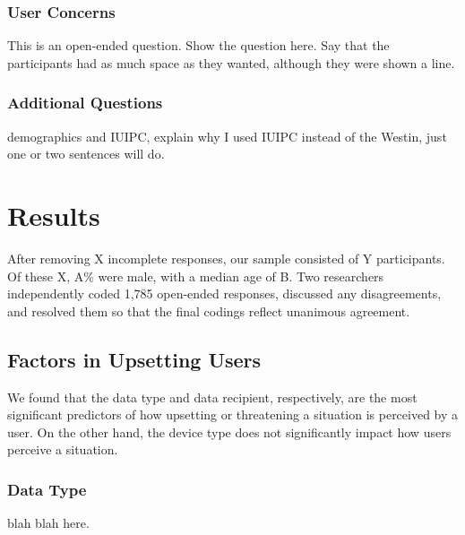 \documentclass{acm_proc_article-sp}
\begin{document}
\subsubsection{User Concerns}
This is an open-ended question. Show the question here. Say that the participants had as much space as they wanted, although they were shown a line. 

\subsubsection{Additional Questions}
demographics and IUIPC, explain why I used IUIPC instead of the Westin, just one or two sentences will do. 


\section{Results}
After removing X incomplete responses, our sample consisted of Y participants. Of these X, A\% were male, with a median age of B. Two researchers independently coded 1,785 open-ended responses, discussed any disagreements, and resolved them so that the final codings reflect unanimous agreement. 

\subsection{Factors in Upsetting Users}
We found that the data type and data recipient, respectively, are the most significant predictors of how upsetting or threatening a situation is perceived by a user. On the other hand, the device type does not significantly impact how users perceive a situation.

\subsubsection{Data Type}
blah blah here. 
\end{document}
